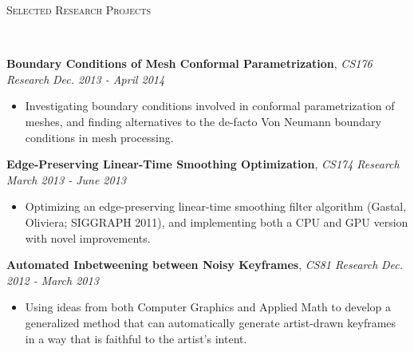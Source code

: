 \documentclass[9pt]{article}
\newenvironment{changemargin}[2]{%
  \begin{list}{}{%
    \setlength{\topsep}{0pt}%
    \setlength{\leftmargin}{#1}%
    \setlength{\rightmargin}{#2}%
    \setlength{\listparindent}{\parindent}%
    \setlength{\itemindent}{\parindent}%
    \setlength{\parsep}{\parskip}%
  }%
  \item[]}{\end{list}
}
\newcommand{\lineover}{
	\begin{changemargin}{-0.05in}{-0.05in}
		\vspace*{-8pt}
		\hrulefill \\
		\vspace*{-2pt}
	\end{changemargin}
}
\newcommand{\header}[1]{
	\begin{changemargin}{-0.5in}{-0.5in}
		\scshape{#1}\\
  	\lineover
	\end{changemargin}
}
\newenvironment{body} {
	\vspace*{-16pt}
	\begin{changemargin}{-0.25in}{-0.5in}
  }	
	{\end{changemargin}
}
\begin{document}
\header{Selected Research Projects}
\begin{body}
	\vspace{16pt}
	\textbf{Boundary Conditions of Mesh Conformal Parametrization}, \emph{CS176 Research} \hfill \emph{Dec. 2013 - April 2014} \\
		\vspace*{-3pt}
	\begin{itemize} \itemsep -0pt
	\item Investigating boundary conditions involved in conformal parametrization of meshes, and finding alternatives to the de-facto Von Neumann boundary conditions in mesh processing.
	\end{itemize}
		\vspace*{-3pt}
	\textbf{Edge-Preserving Linear-Time Smoothing Optimization}, \emph{CS174 Research} \hfill \emph{March 2013 - June 2013} \\
		\vspace*{-3pt}
	\begin{itemize} \itemsep -0pt
		\item Optimizing an edge-preserving linear-time smoothing filter algorithm (Gastal, Oliviera; SIGGRAPH 2011), and implementing both a CPU and GPU version with novel improvements.
	\end{itemize}
		\vspace*{-3pt}
	\textbf{Automated Inbetweening between Noisy Keyframes}, \emph{CS81 Research} \hfill \emph{Dec. 2012 - March 2013} \\
		\vspace*{-3pt}
	\begin{itemize} \itemsep -0pt
		\item Using ideas from both Computer Graphics and Applied Math to develop a generalized method that can automatically generate artist-drawn keyframes in a way that is faithful to the artist's intent.
	\end{itemize}

\end{body}

\smallskip
\end{document}
